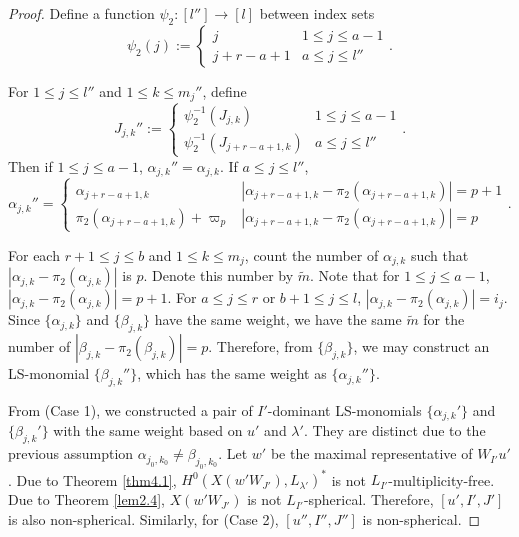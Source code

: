 \documentclass[12pt]{amsart}
\theoremstyle{definition}
\theoremstyle{remark}
\begin{document}
\begin{proof}
Define a function $\psi_2 : [l''] \rightarrow [l]$ between index sets
\begin{equation}
\psi_2 (j):= 
\begin{cases}
j & 1\leq j \leq a-1 \\
j+r-a+1 & a \leq j \leq l''
\end{cases}
.
\end{equation}

For $1 \leq j \leq l''$ and $1 \leq k \leq m_j ''$, define
\begin{equation}
J_{j,k}'' :=
\begin{cases}
\psi_2^{-1}(J_{j,k}) & 1 \leq j \leq a-1 \\
\psi_2^{-1} (J_{j+r-a+1,k}) & a \leq j \leq l''
\end{cases}
.
\end{equation}
Then if $1 \leq j \leq a-1$, $\alpha_{j,k}'' = \alpha_{j,k}$. If $a \leq j \leq l''$,
\begin{equation}
\alpha_{j,k}'' = 
\begin{cases}
\alpha_{j+r-a+1 , k} & |\alpha_{j+r-a+1,k}-\pi_2 (\alpha_{j+r-a+1,k})| = p+1 \\
\pi_2(\alpha_{j+r-a+1,k})+ \varpi_p  & |\alpha_{j+r-a+1,k}-\pi_2 (\alpha_{j+r-a+1,k})| = p
\end{cases}
.
\end{equation}

For each $r+1 \leq j \leq b$ and $1 \leq k \leq m_j$, count the number of $\alpha_{j,k}$ such that $|\alpha_{j,k}-\pi_2 (\alpha_{j,k})|$ is $p$. Denote this number by $\tilde{m}$. Note that for $1 \leq j \leq a-1$, $|\alpha_{j,k}-\pi_2 (\alpha_{j,k})| = p+1$. For $a \leq j \leq r$ or $b+1 \leq j \leq l$, $|\alpha_{j,k}-\pi_2 (\alpha_{j,k})| = i_j$. Since $\{ \alpha_{j,k} \}$ and $\{ \beta_{j,k} \}$ have the same weight, we have the same $\tilde{m}$ for the number of $|\beta_{j,k}-\pi_2 (\beta_{j,k})| = p$. Therefore, from $\{ \beta_{j,k} \}$, we may construct an LS-monomial $\{ \beta_{j,k} '' \}$, which has the same weight as $\{ \alpha_{j,k} ''\}$.

From (Case 1), we constructed a pair of $I'$-dominant LS-monomials $\{ \alpha_{j,k} ' \}$ and $\{ \beta_{j,k} ' \}$ with the same weight based on $u'$ and $\lambda'$. They are distinct due to the previous assumption $\alpha_{j_0 , k_0} \neq \beta_{j_0 , k_0}$. Let $w'$ be the maximal representative of $W_{I'} u'$. Due to Theorem \ref{thm4.1}, $H^0(X(w'W_{J'}), L_{\lambda'})^*$ is not $L_{I'}$-multiplicity-free. Due to Theorem \ref{lem2.4}, $X(w'W_{J'})$ is not $L_{I'}$-spherical. Therefore, $[u',I',J']$ is also non-spherical. Similarly, for (Case 2), $[u'',I'',J'']$ is non-spherical.
\end{proof}
\end{document}
